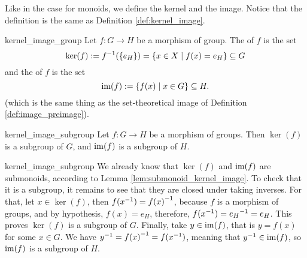 Like in the case for monoids, we define the kernel and the image. Notice that the definition is the same as Definition \ref{def:kernel_image}.
\begin{cdef}{}{kernel_image_group}
    Let \( f : G \to H \) be a morphism of group. The  of \( f \) is the set
    \begin{equation*}
        \ker(f) := f^{-1}(\{ e_H \}) = \{ x \in X \mid f(x) = e_H \} \subseteq G
    \end{equation*}
    and the  of \( f \) is the set
    \begin{equation*}
        \operatorname{im}(f) := \{ f(x) \mid x \in G \} \subseteq H.
    \end{equation*}
    (which is the same thing as the set-theoretical image of Definition \ref{def:image_preimage}).
\end{cdef}

\begin{clem}{}{kernel_image_subgroup}
    Let \( f : G \to H \) be a morphism of groups. Then \( \ker(f) \) is a subgroup of \( G \), and \( \operatorname{im}(f) \) is a subgroup of \( H \).
\end{clem}
\begin{lemproof}{kernel_image_subgroup}
    We already know that \( \ker(f) \) and \( \operatorname{im}(f) \) are submonoids, according to Lemma \ref{lem:submonoid_kernel_image}. To check that it is a subgroup, it remains to see that they are closed under taking inverses. For that, let \( x \in \ker(f) \), then \( f({x}^{-1}) = {f(x)}^{-1} \), because \( f \) is a morphism of groups, and by hypothesis, \( f(x) = e_H \), therefore, \( f({x}^{-1}) = {e_H}^{-1} = e_H \). This proves \( \ker(f) \) is a subgroup of \( G \). Finally, take \( y \in \operatorname{im}(f) \), that is \( y = f(x) \) for some \( x \in G \). We have \( {y}^{-1} = {f(x)}^{-1} = f({x}^{-1}) \), meaning that \( {y}^{-1} \in \operatorname{im}(f) \), so \( \operatorname{im}(f) \) is a subgroup of \( H \).
\end{lemproof}

